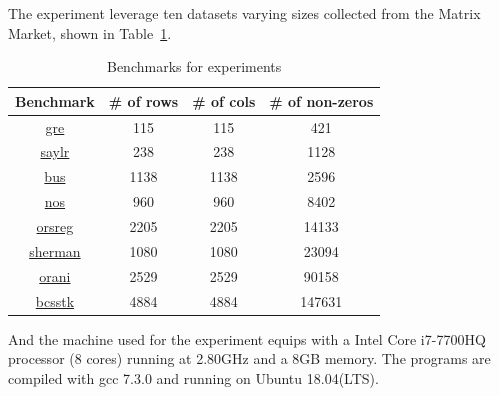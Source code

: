 \documentclass[english]{thesis}
\begin{document}
The experiment leverage ten datasets varying sizes collected from the Matrix Market, shown in Table~\ref{tab:benchmark}.
\begin{table}[H]
\caption{Benchmarks for experiments}
\label{tab:benchmark}
\centering
\begin{tabular}{|c|c|c|c|}\hline
\textbf{Benchmark} & \textbf{\# of rows} & \textbf{\# of cols} & \textbf{\# of non-zeros}\\\hline
\href{https://math.nist.gov/MatrixMarket/data/Harwell-Boeing/grenoble/gre__115.html}{gre} & 115 & 115 & 421\\\hline
\href{https://math.nist.gov/MatrixMarket/data/Harwell-Boeing/saylor/saylr1.html}{saylr} & 238 & 238 & 1128 \\\hline
\href{http://math.nist.gov/MatrixMarket/data/Harwell-Boeing/psadmit/1138_bus.html}{bus} & 1138 & 1138 & 2596\\\hline
\href{https://math.nist.gov/MatrixMarket/data/Harwell-Boeing/lanpro/nos3.html}{nos} & 960 & 960 & 8402\\\hline
\href{https://math.nist.gov/MatrixMarket/data/Harwell-Boeing/oilgen/orsreg_1.html}{orsreg} & 2205 & 2205 & 14133\\\hline
\href{https://math.nist.gov/MatrixMarket/data/Harwell-Boeing/sherman/sherman2.html}{sherman} & 1080 & 1080 & 23094\\\hline
\href{https://math.nist.gov/MatrixMarket/data/Harwell-Boeing/econaus/orani678.html}{orani} & 2529 & 2529 & 90158\\\hline
\href{https://math.nist.gov/MatrixMarket/data/Harwell-Boeing/bcsstruc2/bcsstk16.html}{bcsstk} & 4884 & 4884 & 147631\\\hline
\end{tabular}
\end{table}

And the machine used for the experiment equips with a Intel Core i7-7700HQ processor (8 cores) running at 2.80GHz and a 8GB memory.
The programs are compiled with gcc 7.3.0 and running on Ubuntu 18.04(LTS).
\end{document}
